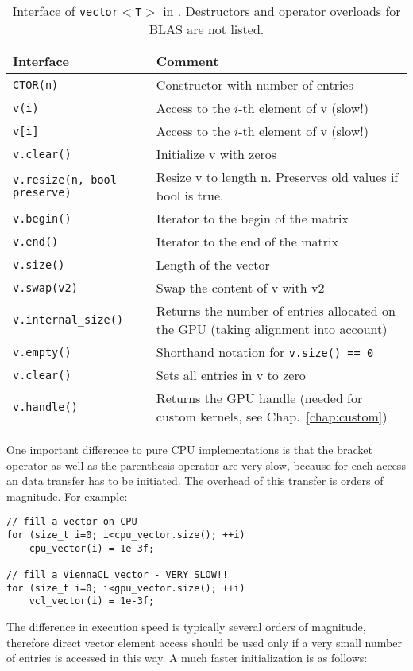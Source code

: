 \begin{table}[tb]
\begin{center}
\begin{tabular}{p{6.5cm}|p{8.5cm}}
Interface & Comment\\
\hline
\texttt{CTOR(n)}    & Constructor with number of entries \\
\texttt{v(i)}    & Access to the $i$-th element of v (slow!) \\
\texttt{v[i]}    & Access to the $i$-th element of v (slow!) \\
\texttt{v.clear()}    & Initialize v with zeros \\
\texttt{v.resize(n, bool preserve)}    & Resize v to length n. Preserves old values if bool is true. \\
\texttt{v.begin()}   & Iterator to the begin of the matrix \\
\texttt{v.end()}   & Iterator to the end of the matrix \\
\texttt{v.size()}    & Length of the vector \\
\texttt{v.swap(v2)}   & Swap the content of v with v2 \\
\texttt{v.internal\_size()} & Returns the number of entries allocated on the GPU (taking alignment into account) \\
\texttt{v.empty()}   & Shorthand notation for \texttt{v.size() == 0} \\
\texttt{v.clear()}   & Sets all entries in v to zero \\
\texttt{v.handle()}  & Returns the GPU handle (needed for custom kernels, see Chap.~\ref{chap:custom})
\end{tabular}
\caption{Interface of \texttt{vector$<$T$>$} in \ViennaCL. Destructors and
operator overloads for BLAS are not listed.}
\label{tab:vector-interface}
\end{center}
\end{table}

One important difference to pure CPU implementations is that the bracket operator
as well as the parenthesis operator are very slow, because for each access an {\OpenCL}
data transfer has to be initiated. The overhead of this transfer is orders of
magnitude. For example:
  \begin{lstlisting}
// fill a vector on CPU
for (size_t i=0; i<cpu_vector.size(); ++i)
    cpu_vector(i) = 1e-3f;

// fill a ViennaCL vector - VERY SLOW!!
for (size_t i=0; i<gpu_vector.size(); ++i)
    vcl_vector(i) = 1e-3f;
\end{lstlisting} 
The difference in execution speed is typically several orders of magnitude,
therefore direct vector element access should be used only if a very small
number of entries is accessed in this way. A much faster initialization is as
follows:

